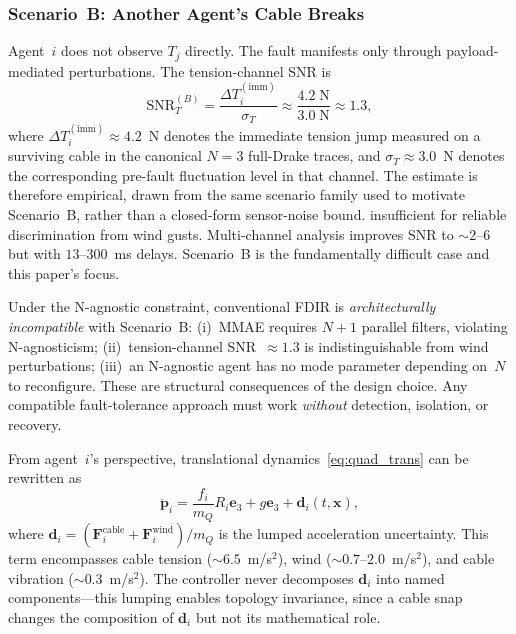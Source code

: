 \subsubsection{Scenario~B: Another Agent's Cable Breaks}
\label{sec:why_fdir_fails}

Agent~$i$ does not observe $T_j$ directly. The fault manifests only through payload-mediated perturbations. The tension-channel SNR is
\begin{equation}\label{eq:snr_ps}
  \mathrm{SNR}_T^{(B)} = \frac{\Delta T_i^{(\mathrm{imm})}}{\sigma_T} \approx \frac{4.2\;\text{N}}{3.0\;\text{N}} \approx 1.3,
\end{equation}
where $\Delta T_i^{(\mathrm{imm})} \approx 4.2$~N denotes the immediate tension jump measured on a surviving cable in the canonical $N{=}3$ full-Drake traces, and $\sigma_T \approx 3.0$~N denotes the corresponding pre-fault fluctuation level in that channel. The estimate is therefore empirical, drawn from the same scenario family used to motivate Scenario~B, rather than a closed-form sensor-noise bound.
insufficient for reliable discrimination from wind gusts. Multi-channel analysis improves SNR to ${\sim}2$--$6$ but with $13$--$300$~ms delays. Scenario~B is the fundamentally difficult case and this paper's focus.

Under the N-agnostic constraint, conventional FDIR is \emph{architecturally incompatible} with Scenario~B: (i)~MMAE requires $N{+}1$ parallel filters, violating N-agnosticism; (ii)~tension-channel SNR~$\approx 1.3$ is indistinguishable from wind perturbations; (iii)~an N-agnostic agent has no mode parameter depending on~$N$ to reconfigure. These are structural consequences of the design choice. Any compatible fault-tolerance approach must work \emph{without} detection, isolation, or recovery.

From agent~$i$'s perspective, translational dynamics~\eqref{eq:quad_trans} can be rewritten as
\begin{equation}\label{eq:lumped_dynamics}
  \ddot{\bm{p}}_i = \frac{f_i}{m_Q} R_i \bm{e}_3 + g\bm{e}_3 + \bm{d}_i(t, \bm{x}),
\end{equation}
where $\bm{d}_i = (\bm{F}_i^{\mathrm{cable}} + \bm{F}_i^{\mathrm{wind}})/m_Q$ is the lumped acceleration uncertainty. This term encompasses cable tension (${\sim}6.5$~m/s$^2$), wind (${\sim}0.7$--$2.0$~m/s$^2$), and cable vibration (${\sim}0.3$~m/s$^2$). The controller never decomposes $\bm{d}_i$ into named components---this lumping enables topology invariance, since a cable snap changes the composition of $\bm{d}_i$ but not its mathematical role.


